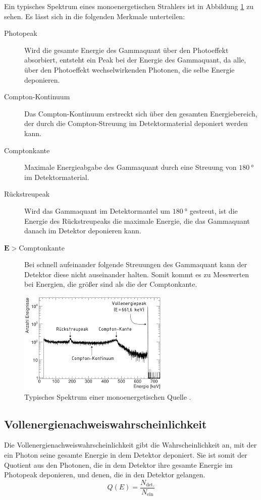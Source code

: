 Ein typisches Spektrum eines monoenergetischen Strahlers ist in Abbildung \ref{fig:Theorie-Spektrum} zu sehen.
Es lässt sich in die folgenden Merkmale unterteilen:
\begin{description}
  \item[Photopeak] Wird die gesamte Energie des Gammaquant über den Photoeffekt absorbiert, entsteht ein Peak bei der Energie des Gammaquant, da alle, über den Photoeffekt wechselwirkenden Photonen, die selbe Energie deponieren. \\
  \item[Compton-Kontinuum] Das Compton-Kontinuum erstreckt sich über den gesamten Energiebereich, der durch die Compton-Streuung im Detektormaterial deponiert werden kann. \\
  \item[Comptonkante] Maximale Energieabgabe des Gammaquant durch eine Streuung von $\SI{180}{\degree}$ im Detektormaterial.\\
  \item[Rückstreupeak] Wird das Gammaquant im Detektormantel um $\SI{180}{\degree}$ gestreut, ist die Energie des Rückstreupeaks die maximale Energie, die das Gammaquant danach im Detektor deponieren kann.
  \item[$\symbf{E >} \text{Comptonkante}$] Bei schnell aufeinander folgende Streuungen des Gammaquant kann der Detektor diese nicht auseinander halten. Somit kommt es zu Messwerten bei Energien, die größer sind als die der Comptonkante.
\end{description}

\begin{figure}[H]
  \centering
  \includegraphics[width = .7\textwidth]{Theorie-spektrum.png}
  \caption{Typisches Spektrum einer monoenergetischen Quelle \cite{Theorie-Spektrum}.}
  \label{fig:Theorie-Spektrum}
\end{figure}

\subsection{Vollenergienachweiswahrscheinlichkeit}
Die Vollenergienachweiswahrscheinlichkeit gibt die Wahrscheinlichkeit an, mit der ein Photon seine gesamte Energie in dem Detektor deponiert.
Sie ist somit der Quotient aus den Photonen, die in dem Detektor ihre gesamte Energie im Photopeak deponieren, und denen, die in den Detektor gelangen.
\begin{equation*}
  Q(E) = \frac{N_\text{det.}}{N_\text{ein}}
\end{equation*}

